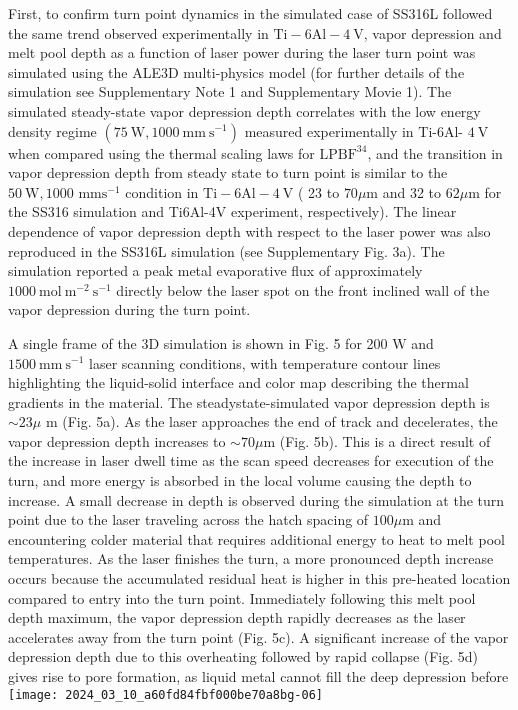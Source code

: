 \documentclass[10pt]{article}
\begin{document}
First, to confirm turn point dynamics in the simulated case of SS316L followed the same trend observed experimentally in $\mathrm{Ti}-6 \mathrm{Al}-4 \mathrm{~V}$, vapor depression and melt pool depth as a function of laser power during the laser turn point was simulated using the ALE3D multi-physics model (for further details of the simulation see Supplementary Note 1 and Supplementary Movie 1). The simulated steady-state vapor depression depth correlates with the low energy density regime $\left(75 \mathrm{~W}, 1000 \mathrm{~mm} \mathrm{~s}^{-1}\right)$ measured experimentally in Ti-6Al- $4 \mathrm{~V}$ when compared using the thermal scaling laws for $\mathrm{LPBF}^{34}$, and the transition in vapor depression depth from steady state to turn point is similar to the $50 \mathrm{~W}, 1000$ $\mathrm{mm} \mathrm{s}^{-1}$ condition in $\mathrm{Ti}-6 \mathrm{Al}-4 \mathrm{~V}$ ( 23 to $70 \mu \mathrm{m}$ and 32 to $62 \mu \mathrm{m}$ for the SS316 simulation and Ti6Al-4V experiment, respectively). The linear dependence of vapor depression depth with respect to the laser power was also reproduced in the SS316L simulation (see Supplementary Fig. 3a). The simulation reported a peak metal evaporative flux of approximately $1000 \mathrm{~mol} \mathrm{~m}^{-2} \mathrm{~s}^{-1}$ directly below the laser spot on the front inclined wall of the vapor depression during the turn point.

A single frame of the 3D simulation is shown in Fig. 5 for 200 $\mathrm{W}$ and $1500 \mathrm{~mm} \mathrm{~s}^{-1}$ laser scanning conditions, with temperature contour lines highlighting the liquid-solid interface and color map describing the thermal gradients in the material. The steadystate-simulated vapor depression depth is $\sim 23 \mu$ m (Fig. 5a). As the laser approaches the end of track and decelerates, the vapor depression depth increases to $\sim 70 \mu \mathrm{m}$ (Fig. 5b). This is a direct result of the increase in laser dwell time as the scan speed decreases for execution of the turn, and more energy is absorbed in the local volume causing the depth to increase. A small decrease in depth is observed during the simulation at the turn point due to the laser traveling across the hatch spacing of $100 \mu \mathrm{m}$ and encountering colder material that requires additional energy to heat to melt pool temperatures. As the laser finishes the turn, a more pronounced depth increase occurs because the accumulated residual heat is higher in this pre-heated location compared to entry into the turn point. Immediately following this melt pool depth maximum, the vapor depression depth rapidly decreases as the laser accelerates away from the turn point (Fig. 5c). A significant increase of the vapor depression depth due to this overheating followed by rapid collapse (Fig. 5d) gives rise to pore formation, as liquid metal cannot fill the deep depression before\\
\texttt{[image: 2024\_03\_10\_a60fd84fbf000be70a8bg-06]}
\end{document}

